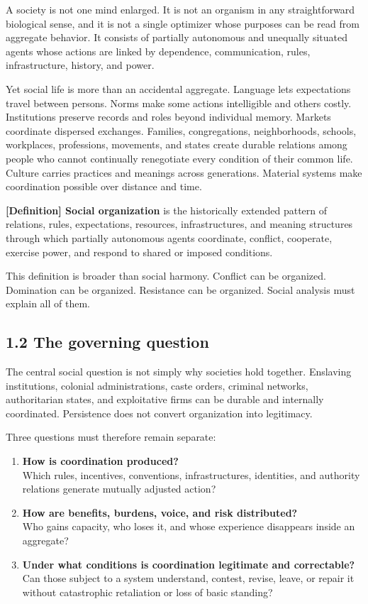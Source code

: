 \documentclass[
  11pt,
]{article}
\begin{document}
A society is not one mind enlarged. It is not an organism in any
straightforward biological sense, and it is not a single optimizer whose
purposes can be read from aggregate behavior. It consists of partially
autonomous and unequally situated agents whose actions are linked by
dependence, communication, rules, infrastructure, history, and power.

Yet social life is more than an accidental aggregate. Language lets
expectations travel between persons. Norms make some actions
intelligible and others costly. Institutions preserve records and roles
beyond individual memory. Markets coordinate dispersed exchanges.
Families, congregations, neighborhoods, schools, workplaces,
professions, movements, and states create durable relations among people
who cannot continually renegotiate every condition of their common life.
Culture carries practices and meanings across generations. Material
systems make coordination possible over distance and time.

\textbf{{[}Definition{]} Social organization} is the historically
extended pattern of relations, rules, expectations, resources,
infrastructures, and meaning structures through which partially
autonomous agents coordinate, conflict, cooperate, exercise power, and
respond to shared or imposed conditions.

This definition is broader than social harmony. Conflict can be
organized. Domination can be organized. Resistance can be organized.
Social analysis must explain all of them.

\subsection{1.2 The governing question}\label{the-governing-question}

The central social question is not simply why societies hold together.
Enslaving institutions, colonial administrations, caste orders, criminal
networks, authoritarian states, and exploitative firms can be durable
and internally coordinated. Persistence does not convert organization
into legitimacy.

Three questions must therefore remain separate:

\begin{enumerate}
\def\labelenumi{\arabic{enumi}.}
\item
  \textbf{How is coordination produced?}\\
  Which rules, incentives, conventions, infrastructures, identities, and
  authority relations generate mutually adjusted action?
\item
  \textbf{How are benefits, burdens, voice, and risk distributed?}\\
  Who gains capacity, who loses it, and whose experience disappears
  inside an aggregate?
\item
  \textbf{Under what conditions is coordination legitimate and
  correctable?}\\
  Can those subject to a system understand, contest, revise, leave, or
  repair it without catastrophic retaliation or loss of basic standing?
\end{enumerate}
\end{document}
